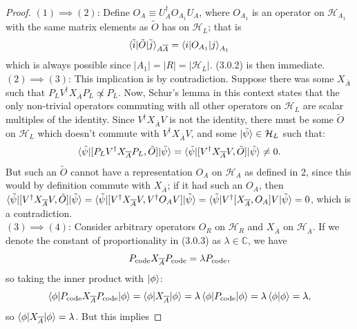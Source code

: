 \documentclass[12pt,a4paper]{report}
\numberwithin{equation}{section}
\newcommand{\Pc}{P_{\text{code}}}
\newcommand{\ol}[1]{\overline{#1}}
\theoremstyle{definition}
\theoremstyle{theorem}
\theoremstyle{theorem}
\theoremstyle{example}
\theoremstyle{definition}
\begin{document}
\begin{proof}
	$(1)\implies(2)$: Define $O_{A}\equiv U_{A}^{\dagger}O_{A_{1}}U_{A}$, where $O_{A_{1}}$ is an operator on $\mathcal{H}_{A_{1}}$ with the same matrix elements as $\tilde{O}$ has on $\mathcal{H}_{L}$; that is
	\begin{equation*}
		\braket{\tilde{i}|\tilde{O}|\tilde{j}}_{A\ol{A}}=\braket{i|O_{A_{1}}|j}_{A_{1}}
	\end{equation*}
	which is always possible since $|A_{1}|=|R|=|\mathcal{H}_{L}|$. (3.0.2) is then immediate.\\
	$(2)\implies(3)$: This implication is by contradiction. Suppose there was some $X_{\ol{A}}$ such that $P_{L}V^{\dagger} X_{\ol{A}}P_{L} \not\propto P_{L}$. Now, Schur's lemma in this context states that the only non-trivial operators commuting with all other operators on $\mathcal{H}_{L}$ are scalar multiples of the identity. Since $V^{\dagger}X_{\ol{A}}V$ is not the identity, there must be some $\tilde{O}$ on $\mathcal{H}_{L}$ which doesn't commute with $V^{\dagger}X_{\ol{A}}V$, and some $\ket{\tilde{\psi}}\in\mathcal{H}_{L}$ such that:
	\begin{equation}
		\braket{\tilde{\psi}|[P_{L}V^{\dagger} X_{\ol{A}}P_{L},\tilde{O}]|\tilde{\psi}}=\braket{\tilde{\psi}|[V^{\dagger}X_{\ol{A}}V,\tilde{O}]|\tilde{\psi}}\neq 0.
	\end{equation}
	But such an $\tilde{O}$ cannot have a representation $O_{A}$ on $\mathcal{H}_{A}$ as defined in 2, since this would by definition commute with $X_{\ol{A}}$; if it had such an $O_{A}$, then $\braket{\tilde{\psi}|[V^{\dagger}X_{\ol{A}}V,\tilde{O}]|\tilde{\psi}}=\braket{\tilde{\psi}|[V^{\dagger}X_{\ol{A}}V,V^{\dagger}O_{A}V]|\tilde{\psi}}=\braket{\tilde{\psi}|V^{\dagger}[X_{\ol{A}},O_{A}]V|\tilde{\psi}}=0$, which is a contradiction.\\
	$(3)\implies (4)$: Consider arbitrary operators $O_{R}$ on $\mathcal{H}_{R}$ and $X_{\overline{A}}$ on $\mathcal{H}_{\overline{A}}$. If we denote the constant of proportionality in (3.0.3) as $\lambda\in\mathbb{C}$, we have
	\begin{equation}
		\Pc\Xabar\Pc=\lambda\Pc,
	\end{equation}
	so taking the inner product with $\ket{\phi}$:
	\begin{equation}
		\braket{\phi|\Pc\Xabar\Pc|\phi}=\braket{\phi|\Xabar|\phi}=\lambda\braket{\phi|\Pc|\phi}=\lambda\braket{\phi|\phi}=\lambda,
	\end{equation}
	so $\braket{\phi|X_{\overline{A}}|\phi}=\lambda$. But this implies

\end{proof}
\end{document}
